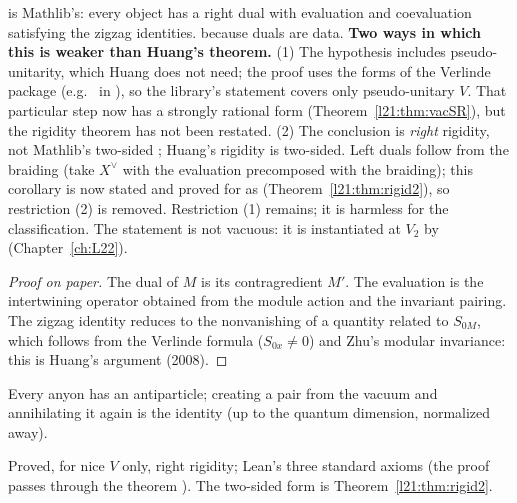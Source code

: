 \begin{dictionary}
 is Mathlib's: every object has a right dual with evaluation and coevaluation satisfying the zigzag
identities.  because duals are data. \textbf{Two ways in which this is weaker than Huang's theorem.} (1) The
hypothesis  includes pseudo-unitarity, which Huang does not need; the proof uses the  forms of
the Verlinde package (e.g.\  in ), so the library's statement
covers only pseudo-unitary $V$. That particular step now has a strongly rational form (Theorem~\ref{l21:thm:vacSR}), but
the rigidity theorem has not been restated. (2) The conclusion is \emph{right} rigidity, not Mathlib's two-sided ; Huang's
rigidity is two-sided. Left duals follow from the braiding (take $X^\vee$ with the evaluation precomposed with the
braiding); this corollary is now stated and proved for  as 
(Theorem~\ref{l21:thm:rigid2}), so restriction (2) is removed. Restriction (1) remains; it is harmless for the classification.
The statement is not vacuous: it is instantiated at $V_2$ by  (Chapter~\ref{ch:L22}).
\end{dictionary}

\begin{proof}[Proof on paper]
The dual of $M$ is its contragredient $M'$. The evaluation is the intertwining operator obtained from the module action and
the invariant pairing. The zigzag identity reduces to the nonvanishing of a quantity related to $S_{0M}$, which follows from the
Verlinde formula ($S_{0x}\ne0$) and Zhu's modular invariance: this is Huang's argument (2008).
\end{proof}

\begin{physics}
Every anyon has an antiparticle; creating a pair from the vacuum and annihilating it again is the identity (up to the quantum
dimension, normalized away).
\end{physics}

\begin{status}
Proved, for nice $V$ only, right rigidity; Lean's three standard axioms (the proof passes through the theorem
). The two-sided form is Theorem~\ref{l21:thm:rigid2}.
\end{status}

